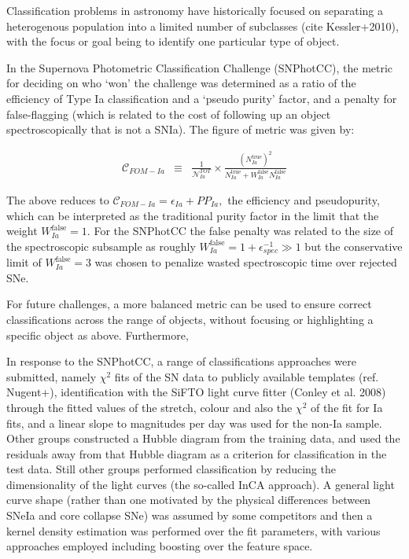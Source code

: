 Classification problems in astronomy have historically focused on separating a heterogenous population into a limited number of subclasses (cite Kessler+2010), with the focus or goal being to identify one particular type of object.

In the Supernova Photometric Classification Challenge (SNPhotCC), the metric for deciding on who `won' the challenge was determined as a ratio of the efficiency of Type Ia classification and a `pseudo purity' factor, and a penalty for false-flagging (which is related to the cost of following up an object spectroscopically that is not a SNIa).
The figure of metric was given by:

\begin{eqnarray}
\mathcal{C}_{FOM-Ia} &\equiv& \frac{1}{\mathcal{N}_{Ia}^{TOT}}\times \frac{(N_{Ia}^{\mathrm{true}})^2}{N_{Ia}^\mathrm{true}+W_{Ia}^\mathrm{false}N_{Ia}^\mathrm{false}}
\end{eqnarray}

The above reduces to $\mathcal{C}_{FOM-Ia}  = \epsilon_{Ia} + PP_{Ia},$ the efficiency and pseudopurity, which can be interpreted as the traditional purity factor in the limit that the weight $W_{Ia}^\mathrm{false} = 1$.
For the SNPhotCC the false penalty was related to the size of the spectroscopic subsample as roughly $W_{Ia}^\mathrm{false} = 1 + \epsilon_{spec}^{-1} \gg 1$ but the conservative limit of $W_{Ia}^\mathrm{false} = 3$ was chosen to penalize wasted spectroscopic time over rejected SNe.

For future challenges, a more balanced metric can be used to ensure correct classifications across the range of objects, without focusing or highlighting a specific object as above.
Furthermore,

In response to the SNPhotCC, a range of classifications approaches were submitted, namely $\chi^{2}$ fits of the SN data to publicly available templates (ref. Nugent+), identification with the SiFTO light curve fitter (Conley et al. 2008) through the fitted values of the stretch, colour and also the $\chi^{2}$ of the fit for Ia fits, and a linear slope to magnitudes per day was used for the non-Ia sample.
Other groups constructed a Hubble diagram from the training data, and used the residuals away from that Hubble diagram as a criterion for classification in the test data.
Still other groups performed classification by reducing the dimensionality of the light curves (the so-called InCA approach).
A general light curve shape (rather than one motivated by the physical differences between SNeIa and core collapse SNe) was assumed by some competitors and then a kernel density estimation was performed over the fit parameters, with various approaches employed including boosting over the feature space.

